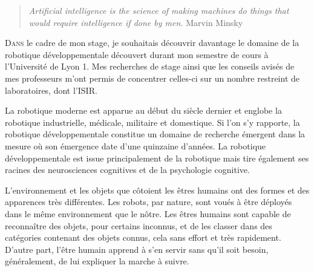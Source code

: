 \documentclass{llncs}
\begin{document}




 \begin{quotation}
  \textit{Artificial intelligence is the science of making machines do things that would require intelligence if done by men.} Marvin Minsky
 \end{quotation}

 
\lettrine{D}{ans} le cadre de mon stage, je souhaitais découvrir davantage le domaine de la robotique développementale découvert durant mon semestre de cours à l'Université de Lyon 1.
Mes recherches de stage ainsi que les conseils avisés de mes professeurs m'ont permis de concentrer celles-ci sur un nombre restreint de laboratoires, dont l'ISIR.

La robotique moderne est apparue au début du siècle dernier et englobe la robotique industrielle, médicale, militaire et domestique.
Si l'on s'y rapporte, la robotique développementale constitue un domaine de recherche émergent dans la mesure où son émergence date d'une quinzaine d'années.
La robotique développementale est issue principalement de la robotique mais tire également ses racines des neurosciences cognitives et de la psychologie cognitive.

L'environnement et les objets que côtoient les êtres humains ont des formes et des apparences très différentes.
Les robots, par nature, sont voués à être déployés dans le même environnement que le nôtre.
Les êtres humains sont capable de reconnaître des objets, pour certains inconnus, et de les classer dans des catégories contenant des objets connus, cela sans effort et très rapidement.
D'autre part, l'être humain apprend à s'en servir sans qu'il soit besoin, généralement, de lui expliquer la marche à suivre.
\end{document}
